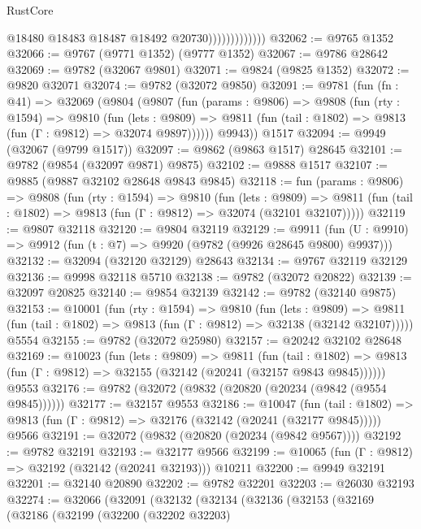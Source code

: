 \begin{lexlean}{RustCore}
\begin{coremodule}
                              @18480
                              @18483
                              @18487
                              @18492
                              @20730)))))))))))))
@32062 := @9765 @1352
@32066 := @9767 (@9771 @1352) (@9777 @1352)
@32067 := @9786 @28642
@32069 := @9782 (@32067 @9801)
@32071 := @9824 (@9825 @1352)
@32072 := @9820 @32071
@32074 := @9782 (@32072 @9850)
@32091 := @9781
    (fun (fn : @41) =>
    @32069
      (@9804
        (@9807
          (fun (params : @9806) =>
          @9808
            (fun (rty : @1594) =>
            @9810
              (fun (lets : @9809) =>
              @9811 (fun (tail : @1802) => @9813 (fun (Γ : @9812) => @32074 @9897))))))
        @9943))
    @1517
@32094 := @9949 (@32067 (@9799 @1517))
@32097 := @9862 (@9863 @1517) @28645
@32101 := @9782 (@9854 (@32097 @9871) @9875)
@32102 := @9888 @1517
@32107 := @9885 (@9887 @32102 @28648 @9843 @9845)
@32118 := fun (params : @9806) =>
  @9808
    (fun (rty : @1594) =>
    @9810
      (fun (lets : @9809) =>
      @9811 (fun (tail : @1802) => @9813 (fun (Γ : @9812) => @32074 (@32101 @32107)))))
@32119 := @9807 @32118
@32120 := @9804 @32119
@32129 := @9911
    (fun (U : @9910) => @9912 (fun (t : @7) => @9920 (@9782 (@9926 @28645 @9800) @9937)))
@32132 := @32094 (@32120 @32129) @28643
@32134 := @9767 @32119 @32129
@32136 := @9998 @32118 @5710
@32138 := @9782 (@32072 @20822)
@32139 := @32097 @20825
@32140 := @9854 @32139
@32142 := @9782 (@32140 @9875)
@32153 := @10001
    (fun (rty : @1594) =>
    @9810
      (fun (lets : @9809) =>
      @9811 (fun (tail : @1802) => @9813 (fun (Γ : @9812) => @32138 (@32142 @32107)))))
    @5554
@32155 := @9782 (@32072 @25980)
@32157 := @20242 @32102 @28648
@32169 := @10023
    (fun (lets : @9809) =>
    @9811
      (fun (tail : @1802) =>
      @9813 (fun (Γ : @9812) => @32155 (@32142 (@20241 (@32157 @9843 @9845))))))
    @9553
@32176 := @9782 (@32072 (@9832 (@20820 (@20234 (@9842 (@9554 @9845))))))
@32177 := @32157 @9553
@32186 := @10047
    (fun (tail : @1802) => @9813 (fun (Γ : @9812) => @32176 (@32142 (@20241 (@32177 @9845)))))
    @9566
@32191 := @32072 (@9832 (@20820 (@20234 (@9842 @9567))))
@32192 := @9782 @32191
@32193 := @32177 @9566
@32199 := @10065 (fun (Γ : @9812) => @32192 (@32142 (@20241 @32193))) @10211
@32200 := @9949 @32191
@32201 := @32140 @20890
@32202 := @9782 @32201
@32203 := @26030 @32193
@32274 := @32066
    (@32091
      (@32132
        (@32134
          (@32136
            (@32153
              (@32169
                (@32186
                  (@32199
                    (@32200
                      (@32202 @32203)

\end{coremodule}
\end{lexlean}
